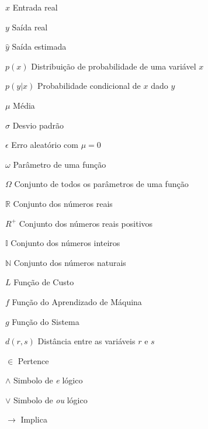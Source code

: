 


\begin{simbolos}
	\item[$x$] Entrada real
	\item[$y$] Saída real
	\item[$\hat{y}$] Saída estimada
	\item[$p(x)$] Distribuição de probabilidade de uma variável $x$
	\item[$p(y | x)$] Probabilidade condicional de $x$ dado $y$
	\item[$\mu$] Média
	\item[$\sigma$] Desvio padrão
	\item[$ \epsilon $] Erro aleatório com $\mu = 0$
	\item[$ \omega $] Parâmetro de uma função
	\item[$ \Omega $] Conjunto de todos os parâmetros de uma função
	\item[$\mathbb {R}$] Conjunto dos números reais
	\item[$R^+$] Conjunto dos números reais positivos
	\item[$\mathbb {I}$] Conjunto dos números inteiros
	\item[$\mathbb {N}$] Conjunto dos números naturais
	\item[$L$] Função de Custo
	\item[$f$] Função do Aprendizado de Máquina 
	\item[$g$] Função do Sistema
	\item[$d(r, s)$] Distância entre as variáveis $r$ e $s$
	\item[$ \in $] Pertence
	\item[$\land$] Simbolo de \textit{e} lógico
	\item[$\lor$] Simbolo de \textit{ou} lógico
	\item[$\rightarrow$] Implica


\end{simbolos}



